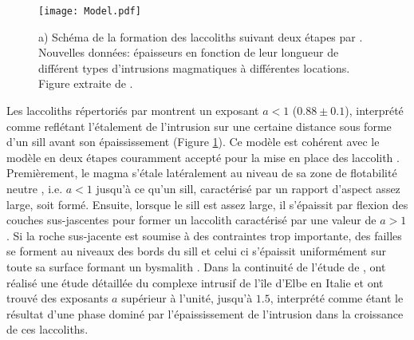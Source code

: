 \begin{figure}[htpb]
  \begin{center}
    \graphicspath{ {/Users/thorey/Documents/These/Manuscript/Figure/Chapter1/} }
    \texttt{[image: Model.pdf]}
    \caption{a)  Schéma de  la formation  des laccoliths  suivant deux
      étapes   par   \citet{McCaffrey:1997ea}.    Nouvelles   données:
      épaisseurs  en  fonction de  leur  longueur  de différent  types
      d'intrusions  magmatiques   à  différentes   locations.   Figure
      extraite de \citet{Cruden:tg}.}
    \label{Model}
  \end{center}
\end{figure}

Les laccoliths  répertoriés par \citet{E:2015tl} montrent  un exposant
$a<1$  ($0.88 \pm  0.1$),  interprété comme  reflétant l'étalement  de
l'intrusion sur une  certaine distance sous forme d'un  sill avant son
épaississement (Figure  \ref{Model}). Ce  modèle est cohérent  avec le
modèle en  deux étapes couramment  accepté pour  la mise en  place des
laccolith  \citep{Johnson:1973ho,McCaffrey:1997ea}.  Premièrement,  le
magma s'étale latéralement au niveau  de sa zone de flotabilité neutre
,  i.e.  $a<1$  jusqu'à  ce  qu'un sill,  caractérisé  par un  rapport
d'aspect assez large, soit formé.   Ensuite, lorsque le sill est assez
large, il s'épaissit par flexion des couches sus-jascentes pour former
un    laccolith    caractérisé    par     une    valeur    de    $a>1$
\citep{Johnson:1973ho,Koch:1981if}.   Si  la   roche  sus-jacente  est
soumise à des  contraintes trop importante, des failles  se forment au
niveaux  des bords  du sill  et celui  ci s'épaissit  uniformément sur
toute  sa  surface formant  un  bysmalith  \citep{E:2015tl}.  Dans  la
continuité      de      l'étude      de      \citet{McCaffrey:1997ea},
\citet{Rocchi:2002jy}  ont réalisé  une  étude  détaillée du  complexe
intrusif de  l'île d'Elbe en  Italie et  ont trouvé des  exposants $a$
supérieur à l'unité, jusqu'à $1.5$, interprété comme étant le résultat
d'une  phase  dominé  par  l'épaississement  de  l'intrusion  dans  la
croissance de ces laccoliths.

